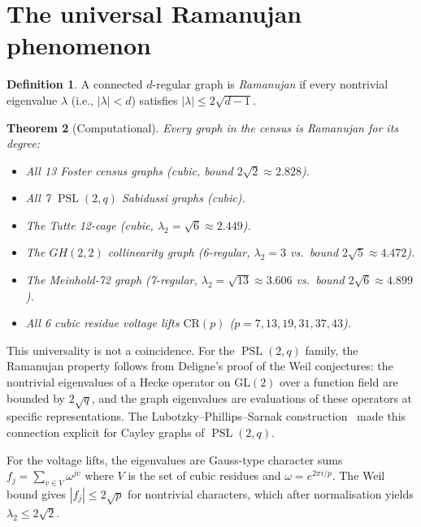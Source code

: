 \documentclass[11pt,a4paper]{article}
\theoremstyle{plain}
\newtheorem{theorem}{Theorem}
\theoremstyle{definition}
\newtheorem{definition}[theorem]{Definition}
\theoremstyle{remark}
\newcommand{\PSL}{\operatorname{PSL}}
\begin{document}
\section{The universal Ramanujan phenomenon}

\begin{definition}
A connected $d$-regular graph is \emph{Ramanujan} if every nontrivial
eigenvalue $\lambda$ (i.e., $|\lambda| < d$) satisfies
$|\lambda| \le 2\sqrt{d-1}$.
\end{definition}

\begin{theorem}[Computational]
\label{thm:all-ramanujan}
Every graph in the census is Ramanujan for its degree:
\begin{itemize}
\item All 13 Foster census graphs (cubic, bound $2\sqrt{2} \approx 2.828$).
\item All 7 $\PSL(2,q)$ Sabidussi graphs (cubic).
\item The Tutte 12-cage (cubic, $\lambda_2 = \sqrt{6} \approx 2.449$).
\item The $GH(2,2)$ collinearity graph (6-regular, $\lambda_2 = 3$
  vs.\ bound $2\sqrt{5} \approx 4.472$).
\item The Meinhold-72 graph (7-regular, $\lambda_2 = \sqrt{13} \approx 3.606$
  vs.\ bound $2\sqrt{6} \approx 4.899$).
\item All 6 cubic residue voltage lifts $\mathrm{CR}(p)$
  ($p = 7, 13, 19, 31, 37, 43$).
\end{itemize}
\end{theorem}

This universality is not a coincidence. For the $\PSL(2,q)$ family, the
Ramanujan property follows from Deligne's proof of the Weil conjectures:
the nontrivial eigenvalues of a Hecke operator on $\mathrm{GL}(2)$ over
a function field are bounded by $2\sqrt{q}$, and the graph eigenvalues
are evaluations of these operators at specific representations.
The Lubotzky--Phillips--Sarnak construction~\cite{LPS} made this
connection explicit for Cayley graphs of $\PSL(2,q)$.

For the voltage lifts, the eigenvalues are Gauss-type character sums
$f_j = \sum_{v \in V} \omega^{jv}$ where $V$ is the set of cubic residues
and $\omega = e^{2\pi i/p}$. The Weil bound gives
$|f_j| \le 2\sqrt{p}$ for nontrivial characters, which after normalisation
yields $\lambda_2 \le 2\sqrt{2}$.
\end{document}
